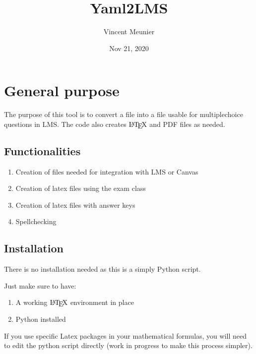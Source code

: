 \documentclass[letterpaper,10pt,english]{sphinxmanual}
\title{Yaml2LMS}
\date{Nov 21, 2020}
\author{Vincent Meunier}
\begin{document}
\pagestyle{empty}
\sphinxmaketitle
\pagestyle{plain}
\sphinxtableofcontents
\pagestyle{normal}
\label{\detokenize{index::doc}}



\chapter{General purpose}
\label{\detokenize{General Purpose:general-purpose}}\label{\detokenize{General Purpose::doc}}
The purpose of this tool is to convert a  file into a file usable for
multiple\sphinxhyphen{}choice questions in LMS. The code also creates  \(\textrm{\LaTeX}\) and PDF files as needed.


\section{Functionalities}
\label{\detokenize{General Purpose:functionalities}}\begin{enumerate}
%
\item {} 
Creation of files needed for integration with LMS or Canvas

\item {} 
Creation of latex files using the exam class

\item {} 
Creation of latex files with answer keys

\item {} 
Spellchecking

\end{enumerate}


\section{Installation}
\label{\detokenize{General Purpose:installation}}
There is no installation needed as this is a simply Python script.

Just make sure to have:
\begin{enumerate}
%
\item {} 
A working  \(\textrm{\LaTeX}\) environment in place

\item {} 
Python installed

\end{enumerate}

If you use specific Latex packages in your mathematical formulas, you will need to edit the python script directly (work in progress to make this process simpler).
\end{document}
